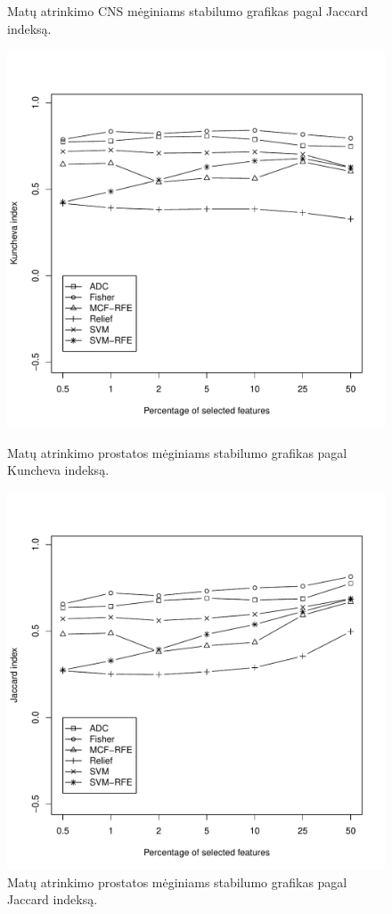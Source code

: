 \begin{figure}[H]
\begin{minipage}[b]{0.47\linewidth}
\caption{Matų atrinkimo CNS mėginiams stabilumo grafikas pagal Jaccard indeksą.}
\label{fig:robj_cns}
\end{minipage}
\hspace{0.2cm}
\begin{minipage}[b]{0.47\linewidth}
\centering
\includegraphics[width=.85\textwidth]{../bachelor/images/prostate_robustness_kuncheva.pdf}
\caption{Matų atrinkimo prostatos mėginiams stabilumo grafikas pagal Kuncheva indeksą.}
\label{fig:robk_prostate}
\end{minipage}
\hspace{0.2cm}
\begin{minipage}[b]{0.47\linewidth}
\centering
\includegraphics[width=.85\textwidth]{../bachelor/images/prostate_robustness_jaccard.pdf}
\caption{Matų atrinkimo prostatos mėginiams stabilumo grafikas pagal Jaccard indeksą.}
\label{fig:robj_prostate}
\end{minipage}
\end{figure}
